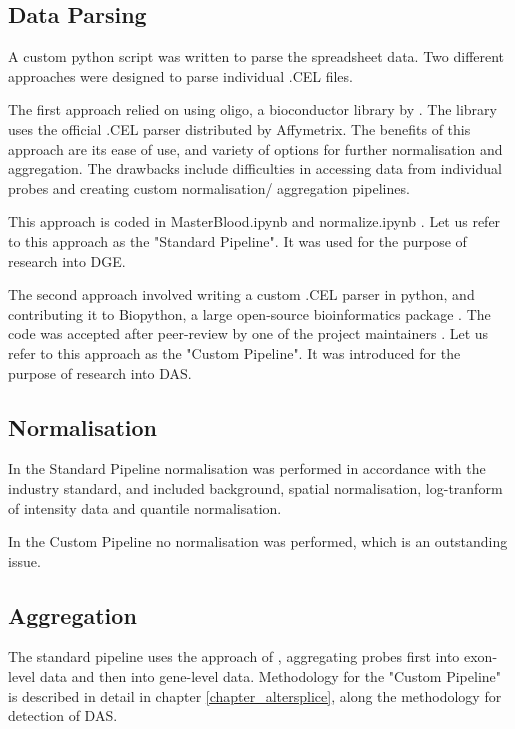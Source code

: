 \subsection{Data Parsing} \label{section_parsing}

A custom python script was written to parse the spreadsheet data. Two different approaches were designed to parse individual .CEL files.

The first approach relied on using oligo, a bioconductor library by \cite{Carvalho2010}. The library uses the official .CEL parser distributed by Affymetrix. The benefits of this approach are its ease of use, and variety of options for further normalisation and aggregation. The drawbacks include difficulties in accessing data from individual probes and creating custom normalisation/ aggregation pipelines.

This approach is coded in MasterBlood.ipynb \parencite{MasterBlood2017} and normalize.ipynb \parencite{Normalise2017}. Let us refer to this approach as the "Standard Pipeline". It was used for the purpose of research into DGE.

The second approach involved writing a custom .CEL parser in python, and contributing it to Biopython, a large open-source bioinformatics package \parencite{Cock2009}. The code was accepted after peer-review by one of the project maintainers \parencite{Kurkiewicz2016}. Let us refer to this approach as the "Custom Pipeline". It was introduced for the purpose of research into DAS.

\subsection{Normalisation}

In the Standard Pipeline normalisation was performed in accordance with the industry standard, and included background, spatial normalisation, log-tranform of intensity data and quantile normalisation.

In the Custom Pipeline no normalisation was performed, which is an outstanding issue.

\subsection{Aggregation}
The standard pipeline uses the approach of \cite{McCall2012}, aggregating probes first into exon-level data and then into gene-level data. Methodology for the "Custom Pipeline" is described in detail in chapter \ref{chapter_altersplice}, along the methodology for detection of DAS.

